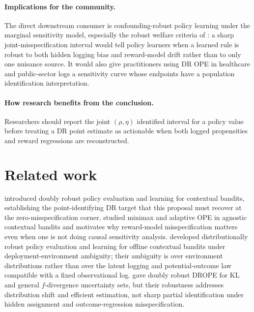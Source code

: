 \documentclass[11pt]{article}
\theoremstyle{definition}
\theoremstyle{plain}
\theoremstyle{remark}
\begin{document}
\paragraph{Implications for the community.}
The direct downstream consumer is confounding-robust policy learning under the marginal sensitivity model, especially the robust welfare criteria of \citet{JinXuZhengZhou2025}: a sharp joint-misspecification interval would tell policy learners when a learned rule is robust to both hidden logging bias and reward-model drift rather than to only one nuisance source. It would also give practitioners using DR OPE in healthcare and public-sector logs a sensitivity curve whose endpoints have a population identification interpretation.

\paragraph{How research benefits from the conclusion.}
Researchers should report the joint $(\rho,\eta)$ identified interval for a policy value before treating a DR point estimate as actionable when both logged propensities and reward regressions are reconstructed.

\section{Related work}
\citet{DudikLangfordLi2011} introduced doubly robust policy evaluation and learning for contextual bandits, establishing the point-identifying DR target that this proposal must recover at the zero-misspecification corner. \citet{WangAgarwalDudik2017} studied minimax and adaptive OPE in agnostic contextual bandits and motivates why reward-model misspecification matters even when one is not doing causal sensitivity analysis. \citet{SiZhangZhouBlanchet2020} developed distributionally robust policy evaluation and learning for offline contextual bandits under deployment-environment ambiguity; their ambiguity is over environment distributions rather than over the latent logging and potential-outcome law compatible with a fixed observational log. \citet{KallusMaoWangZhou2022} gave doubly robust DROPE for KL and general $f$-divergence uncertainty sets, but their robustness addresses distribution shift and efficient estimation, not sharp partial identification under hidden assignment and outcome-regression misspecification.
\end{document}

